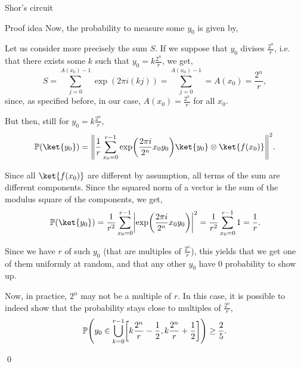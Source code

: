 \documentclass[a4paper]{article}
\begin{document}
\begin{parag}{Shor's circuit}
\begin{subparag}{Proof idea}
        Now, the probability to measure some $y_0$ is given by,

        Let us consider more precisely the sum $S$. If we suppose that $y_0$ divises $\frac{2^n}{r}$, i.e. that there exists some $k$ such that $y_0 = k\frac{2^n}{r}$, we get,
        \[S = \sum_{j=0}^{A\left(x_0\right) - 1} \exp\left(2 \pi i \left(kj\right)\right) = \sum_{j=0}^{A\left(x_0\right) - 1} = A\left(x_0\right) = \frac{2^n}{r},\]
        since, as specified before, in our case, $A\left(x_0\right) = \frac{2^n}{r}$ for all $x_0$.

        But then, still for $y_0 = k\frac{2^n}{r}$, 
        \[\prob\left(\ket{y_0}\right) = \left\|\frac{1}{r} \sum_{x_0 = 0}^{r-1} \exp\left(\frac{2\pi i}{2^n} x_0 y_0\right) \ket{y_0} \otimes \ket{f\left(x_0\right)}\right\|^2 .\]

        Since all $\ket{f\left(x_0\right)}$ are different by assumption, all terms of the sum are different components. Since the squared norm of a vector is the sum of the modulus square of the components, we get,
        \[\prob\left(\ket{y_0}\right) = \frac{1}{r^2} \sum_{x_0 = 0}^{r-1} \left|\exp\left(\frac{2\pi i}{2^n} x_0 y_0\right)\right|^2 = \frac{1}{r^2} \sum_{x_0 = 0}^{r-1} 1 = \frac{1}{r}.\]

        Since we have $r$ of such $y_0$ (that are multiples of $\frac{2^n}{r}$), this yields that we get one of them uniformly at random, and that any other $y_0$ have 0 probability to show up.

        Now, in practice, $2^n$ may not be a multiple of $r$. In this case, it is possible to indeed show that the probability stays close to multiples of $\frac{2^n}{r}$,
        \[\prob\left(y_0 \in \bigcup_{k=0}^{r-1} \left[k \frac{2^n}{r} - \frac{1}{2}, k\frac{2^n}{r} + \frac{1}{2}\right]\right) \geq \frac{2}{5}.\]
        
        \qed
    \end{subparag}
\end{parag}
\end{document}
